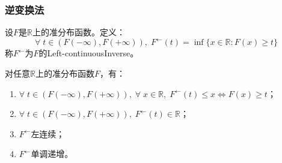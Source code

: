 \subsubsection{逆变换法}
\begin{definition}
	设$F$是$\mathbb{R}$上的准分布函数。定义：
	\begin{equation*}
		\forall\;t\in(F(-\infty),F(+\infty)),\;F^{\leftarrow}(t)=\inf\{x\in\mathbb{R}:F(x)\geqslant t\}
	\end{equation*}
	称$F^{\leftarrow}$为$F$的\gls{Left-continuousInverse}。
\end{definition}
\begin{property}\label{prop:LeftcontinuousInverse}
	对任意$\mathbb{R}$上的准分布函数$F$，有：
	\begin{enumerate}
		\item $\forall\;t\in(F(-\infty),F(+\infty)),\;\forall\;x\in\mathbb{R},\;F^{\leftarrow}(t)\leqslant x\Leftrightarrow F(x)\geqslant t$；
		\item $\forall\;t\in(F(-\infty),F(+\infty)),\;F^{\leftarrow}(t)\in\mathbb{R}$；
		\item $F^{\leftarrow}$左连续；
		\item $F^{\leftarrow}$单调递增。
	\end{enumerate}
\end{property}
